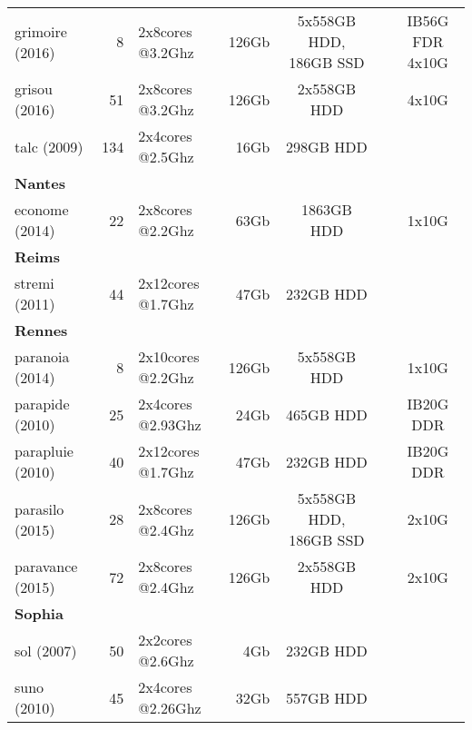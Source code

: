 \begin{center}
\begin{tabular}{|l|r|l|r|c|c|c|}
grimoire (2016) & 8 & 2x8cores @3.2Ghz & 126Gb &  5x558GB HDD, 186GB SSD &  & IB56G FDR 4x10G \\
grisou (2016) & 51 & 2x8cores @3.2Ghz & 126Gb &  2x558GB HDD &  &  4x10G \\
talc (2009) & 134 & 2x4cores @2.5Ghz & 16Gb &  298GB HDD &  &  \\
\textbf{Nantes} &  &  &  &  &  &  \\
econome (2014) & 22 & 2x8cores @2.2Ghz & 63Gb &  1863GB HDD &  &  1x10G \\
\textbf{Reims} &  &  &  &  &  &  \\
stremi (2011) & 44 & 2x12cores @1.7Ghz & 47Gb &  232GB HDD &  &  \\
\textbf{Rennes} &  &  &  &  &  &  \\
paranoia (2014) & 8 & 2x10cores @2.2Ghz & 126Gb &  5x558GB HDD &  &  1x10G \\
parapide (2010) & 25 & 2x4cores @2.93Ghz & 24Gb &  465GB HDD &  & IB20G DDR \\
parapluie (2010) & 40 & 2x12cores @1.7Ghz & 47Gb &  232GB HDD &  & IB20G DDR \\
parasilo (2015) & 28 & 2x8cores @2.4Ghz & 126Gb &  5x558GB HDD, 186GB SSD &  &  2x10G \\
paravance (2015) & 72 & 2x8cores @2.4Ghz & 126Gb &  2x558GB HDD &  &  2x10G \\
\textbf{Sophia} &  &  &  &  &  &  \\
sol (2007) & 50 & 2x2cores @2.6Ghz & 4Gb &  232GB HDD &  &  \\
suno (2010) & 45 & 2x4cores @2.26Ghz & 32Gb &  557GB HDD &  &  \\

\hline 
\end{tabular} 
\end{center}